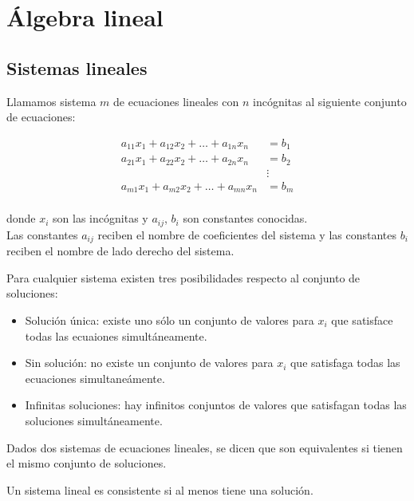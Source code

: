 \chapter{Álgebra lineal}

\section{Sistemas lineales}

\begin{defi}
Llamamos sistema $m$ de ecuaciones lineales con $n$ incógnitas al siguiente conjunto de ecuaciones:

\begin{align*}
a_{11}x_1 + a_{12}x_2 + \dots + a_{1n}x_n & = b_1\\
a_{21}x_1 + a_{22}x_2 + \dots + a_{2n}x_n & = b_2\\
 &\vdots\\
a_{m1}x_1 + a_{m2}x_2 + \dots + a_{mn}x_n & = b_m\\
\end{align*} 

donde $x_i$ son las incógnitas y $a_{ij}$, $b_i$ son constantes conocidas.\\

Las constantes $a_{ij}$ reciben el nombre de coeficientes del sistema y las constantes $b_i$ reciben el nombre de lado derecho del sistema.
\end{defi}

Para cualquier sistema existen tres posibilidades respecto al conjunto de soluciones:

\begin{itemize}
\item Solución única: existe uno  sólo un conjunto de valores para $x_i$ que satisface todas las ecuaiones simultáneamente.
\item Sin solución: no existe un conjunto de valores para $x_i$ que satisfaga todas las ecuaciones simultaneámente.
\item Infinitas soluciones: hay infinitos conjuntos de valores que satisfagan todas las soluciones simultáneamente.
\end{itemize}

\begin{defi}
Dados dos sistemas de ecuaciones lineales, se dicen que son equivalentes si tienen el mismo conjunto de soluciones.
\end{defi}

\begin{defi}
Un sistema lineal es consistente si al menos tiene una solución.
\end{defi}

